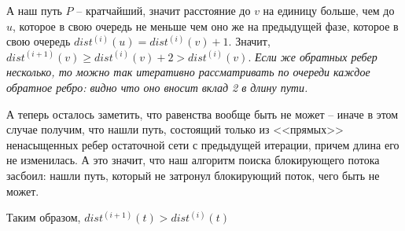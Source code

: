 \documentclass[russian]{article}
\begin{document}
А наш путь $P$ -- кратчайший, значит расстояние до $v$ на единицу больше, чем до $u$, которое в свою очередь не меньше чем оно же на предыдущей фазе, которое в свою очередь $dist^{(i)}(u) = dist^{(i)}(v) + 1$. Значит, $dist^{(i+1)}(v) \geqslant dist^{(i)}(v) + 2 > dist^{(i)}(v)$. \textit{Если же обратных ребер несколько, то можно так итеративно рассматривать по очереди каждое обратное ребро: видно что оно вносит вклад 2 в длину пути.}

А теперь осталось заметить, что равенства вообще быть не может -- иначе в этом случае получим, что нашли путь, состоящий только из <<прямых>> ненасыщенных ребер остаточной сети с предыдущей итерации, причем длина его не изменилась. А это значит, что наш алгоритм поиска блокирующего потока засбоил: нашли путь, который не затронул блокирующий поток, чего быть не может.

Таким образом, $dist^{(i+1)}(t) > dist^{(i)}(t)$
\end{document}
